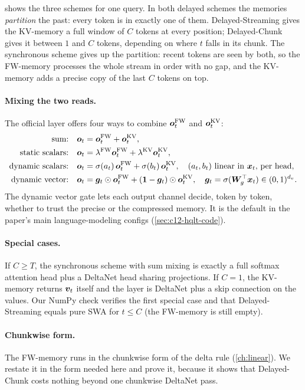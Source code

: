  shows the three schemes for one query. In both delayed schemes the
memories \emph{partition} the past: every token is in exactly one of them. Delayed-Streaming
gives the KV-memory a full window of $C$ tokens at every position; Delayed-Chunk gives it
between $1$ and $C$ tokens, depending on where $t$ falls in its chunk. The synchronous scheme
gives up the partition: recent tokens are seen by both, so the FW-memory processes the whole
stream in order with no gap, and the KV-memory adds a precise copy of the last $C$ tokens on top.

\paragraph{Mixing the two reads.} The official layer offers four ways to combine
$\bm{o}^{\mathrm{FW}}_t$ and $\bm{o}^{\mathrm{KV}}_t$:
\begin{align}
  \text{sum:}\quad & \bm{o}_t = \bm{o}^{\mathrm{FW}}_t + \bm{o}^{\mathrm{KV}}_t,\\
  \text{static scalars:}\quad & \bm{o}_t = \lambda^{\mathrm{FW}}\bm{o}^{\mathrm{FW}}_t + \lambda^{\mathrm{KV}}\bm{o}^{\mathrm{KV}}_t,\\
  \text{dynamic scalars:}\quad & \bm{o}_t = \sigma(a_t)\,\bm{o}^{\mathrm{FW}}_t + \sigma(b_t)\,\bm{o}^{\mathrm{KV}}_t,
     \quad (a_t,b_t) \text{ linear in } \bm{x}_t \text{, per head},\\
  \text{dynamic vector:}\quad & \bm{o}_t = \bm{g}_t\odot\bm{o}^{\mathrm{FW}}_t + (\bm1-\bm{g}_t)\odot\bm{o}^{\mathrm{KV}}_t,
     \quad \bm{g}_t = \sigma(\bm{W}_g^{\top}\bm{x}_t)\in(0,1)^{d_v}. \label{eq:c12-hqlt-gate}
\end{align}
The dynamic vector gate lets each output channel decide, token by token, whether to trust the
precise or the compressed memory. It is the default in the paper's main language-modeling
configs (\cref{sec:c12-hqlt-code}).

\paragraph{Special cases.} If $C\ge T$, the synchronous scheme with sum mixing is exactly a
full softmax attention head plus a DeltaNet head sharing projections. If $C=1$, the KV-memory
returns $\bm{v}_t$ itself and the layer is DeltaNet plus a skip connection on the values. Our NumPy
check verifies the first special case and that Delayed-Streaming equals pure SWA for $t\le C$
(the FW-memory is still empty).

\paragraph{Chunkwise form.} The FW-memory runs in the chunkwise form of the delta rule
(\cref{ch:linear}). We restate it in the form needed here and prove it, because it shows that
Delayed-Chunk costs nothing beyond one chunkwise DeltaNet pass.

